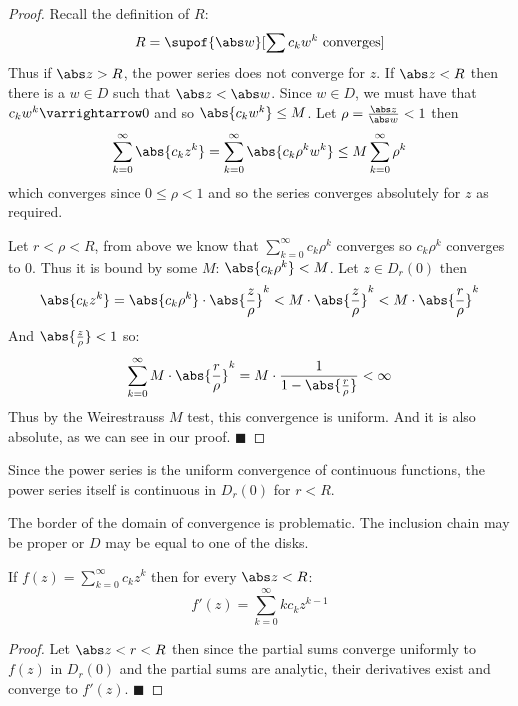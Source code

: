 \documentclass[10pt]{article}
\let\to=\varrightarrow
\def\qed{\hskip1cm\hbox{}\hfill$\blacksquare$}
\begin{document}
\begin{proof}

    Recall the definition of $R$:
    \[ R = \supof{\abs w}[\sum c_kw^k\text{ converges}] \]
    Thus if $\abs z>R$, the power series does not converge for $z$.
    If $\abs z<R$ then there is a $w\in D$ such that $\abs z<\abs w$.
    Since $w\in D$, we must have that $c_kw^k\to0$ and so $\abs{c_kw^k}\leq M$.
    Let $\rho=\frac{\abs z}{\abs w}<1$ then
    \[ \sum_{k=0}^\infty \abs{c_kz^k} = \sum_{k=0}^\infty \abs{c_k\rho^k w^k} \leq M\sum_{k=0}^\infty \rho^k \]
    which converges since $0\leq\rho<1$ and so the series converges absolutely for $z$ as required.

    Let $r<\rho<R$, from above we know that $\sum_{k=0}^\infty c_k\rho^k$ converges so $c_k\rho^k$ converges to $0$.
    Thus it is bound by some $M$: $\abs{c_k\rho^k}<M$.
    Let $z\in D_r(0)$ then
    \[ \abs{c_kz^k} = \abs{c_k\rho^k}\cdot\abs{\frac z\rho}^k < M\cdot\abs{\frac z\rho}^k < M\cdot\abs{\frac r\rho}^k \]
    And $\abs{\frac z\rho}<1$ so:
    \[ \sum_{k=0}^\infty M\cdot\abs{\frac r\rho}^k = M\cdot\frac1{1-\abs{\frac r\rho}} < \infty \]
    Thus by the Weirestrauss $M$ test, this convergence is uniform.
    And it is also absolute, as we can see in our proof.
    \qed

\end{proof}

Since the power series is the uniform convergence of continuous functions, the power series itself is continuous in $D_r(0)$ for $r<R$.

\begin{note}

    The border of the domain of convergence is problematic.
    The inclusion chain may be proper or $D$ may be equal to one of the disks.

\end{note}

\begin{thrm*}

    If $f(z)=\sum_{k=0}^\infty c_kz^k$ then for every $\abs z<R$:
    \[ f'(z) = \sum_{k=0}^\infty kc_kz^{k-1} \]

\end{thrm*}

\begin{proof}

    Let $\abs z<r<R$ then since the partial sums converge uniformly to $f(z)$ in $D_r(0)$ and the partial sums are analytic, their derivatives exist and converge to $f'(z)$.
    \qed

\end{proof}
\end{document}
